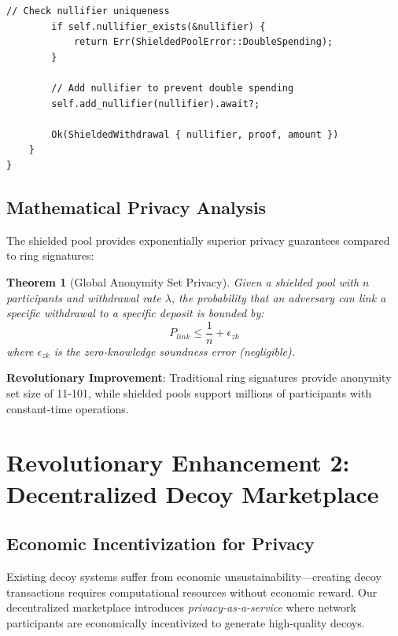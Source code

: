 \documentclass[12pt,a4paper]{article}
\newtheorem{theorem}{Theorem}[section]
\begin{document}
\begin{lstlisting}[style=rustcode, caption=Quantum Shielded Pool Implementation]
        // Check nullifier uniqueness
        if self.nullifier_exists(&nullifier) {
            return Err(ShieldedPoolError::DoubleSpending);
        }
        
        // Add nullifier to prevent double spending
        self.add_nullifier(nullifier).await?;
        
        Ok(ShieldedWithdrawal { nullifier, proof, amount })
    }
}
\end{lstlisting}

\subsection{Mathematical Privacy Analysis}

The shielded pool provides exponentially superior privacy guarantees compared to ring signatures:

\begin{theorem}[Global Anonymity Set Privacy]
Given a shielded pool with $n$ participants and withdrawal rate $\lambda$, the probability that an adversary can link a specific withdrawal to a specific deposit is bounded by:
$$P_{link} \leq \frac{1}{n} + \epsilon_{zk}$$
where $\epsilon_{zk}$ is the zero-knowledge soundness error (negligible).
\end{theorem}

\textbf{Revolutionary Improvement}: Traditional ring signatures provide anonymity set size of 11-101, while shielded pools support millions of participants with constant-time operations.

\section{Revolutionary Enhancement 2: Decentralized Decoy Marketplace}

\subsection{Economic Incentivization for Privacy}

Existing decoy systems suffer from economic unsustainability—creating decoy transactions requires computational resources without economic reward. Our decentralized marketplace introduces \textit{privacy-as-a-service} where network participants are economically incentivized to generate high-quality decoys.
\end{document}

